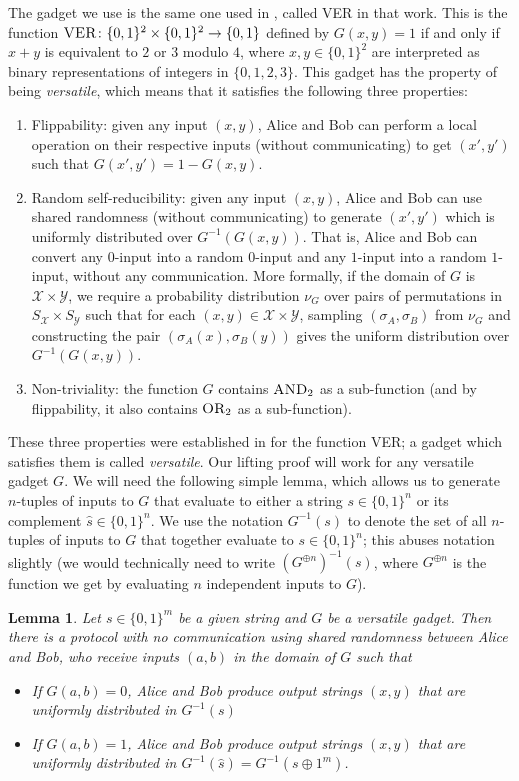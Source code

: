 \documentclass[10pt,a4paper]{article}
\newtheorem{lemma}[theorem]{Lemma}
\theoremstyle{definition}
\newcommand{\B}{\{0,1\}}
\newcommand{\X}{\mathcal{X}}
\newcommand{\Y}{\mathcal{Y}}
\renewcommand{\>}{\rangle}
\newcommand{\<}{\langle}
\newcommand{\OR}{\textsc{OR}}
\newcommand{\AND}{\textsc{AND}}
\begin{document}
The gadget we use is the same one used in \cite{GP18},
called \textsc{VER} in that work. This is the function
$\textsc{VER}\colon\B^2\times\B^2\to\B$ defined by $G(x,y)=1$
if and only if $x+y$ is equivalent to $2$ or $3$ modulo $4$,
where $x,y\in\B^2$ are interpreted as binary representations
of integers in $\{0,1,2,3\}$. This gadget has the property
of being \emph{versatile}, which means that it satisfies
the following three properties:
\begin{enumerate}
\item Flippability: given any input $(x,y)$, Alice
and Bob can perform a local operation on their respective inputs (without communicating)
to get $(x',y')$ such that $G(x',y')=1-G(x,y)$.
\item Random self-reducibility: given any input $(x,y)$,
Alice and Bob can use shared randomness (without communicating)
to generate $(x',y')$ which is uniformly distributed over
$G^{-1}(G(x,y))$. That is, Alice and Bob can convert any $0$-input
into a random $0$-input and any $1$-input into a random $1$-input,
without any communication. More formally,
if the domain of $G$ is $\X\times \Y$,
we require a probability distribution $\nu_G$
over pairs of permutations in $S_{\X}\times S_{\Y}$
such that for each $(x,y)\in\X\times\Y$,
sampling $(\sigma_A,\sigma_B)$ from $\nu_G$
and constructing the pair $(\sigma_A(x),\sigma_B(y))$
gives the uniform distribution over $G^{-1}(G(x,y))$.
\item Non-triviality: the function $G$ contains $\AND_2$
as a sub-function (and by flippability, it also contains
$\OR_2$ as a sub-function).
\end{enumerate}

These three properties were established in \cite{GP18} for
the function \textsc{VER}; a gadget which satisfies
them is called \emph{versatile}.
Our lifting proof will work for any versatile gadget $G$.
We will need the following simple lemma, which allows
us to generate $n$-tuples of inputs to $G$ that evaluate
to either a string $s\in\B^n$ or its complement
$\hat{s}\in\B^n$. We use the notation $G^{-1}(s)$
to denote the set of all $n$-tuples of inputs to $G$
that together evaluate to $s\in\B^n$; this abuses
notation slightly (we would technically need to write
$(G^{\oplus n})^{-1}(s)$, where $G^{\oplus n}$ is
the function we get by evaluating $n$ independent inputs
to $G$).

\begin{lemma}\label{lem:s-sampling}
Let $s\in\{0,1\}^m$ be a given string and $G$ be a versatile gadget. Then there is a protocol with no communication using shared randomness between Alice and Bob, who receive inputs $(a,b)$ in the domain of $G$ such that
\begin{itemize}
 \item If $G(a,b)=0$, Alice and Bob produce output strings $(x,y)$ that are uniformly distributed in $G^{-1}(s)$
 \item If $G(a,b)=1$, Alice and Bob produce output strings $(x,y)$ that are uniformly distributed in $G^{-1}(\hat{s}) = G^{-1}(s\oplus1^m)$.
\end{itemize}
\end{lemma}
\end{document}
